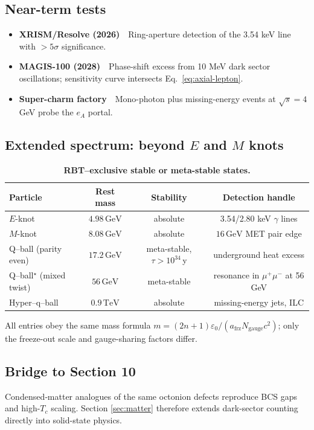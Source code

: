 \subsection{Near-term tests}

\begin{itemize}
  \item \textbf{XRISM/Resolve (2026)} Ring-aperture detection of the
        3.54 keV line with $>5\sigma$ significance.
  \item \textbf{MAGIS-100 (2028)} Phase-shift excess from 10 MeV dark
        sector oscillations; sensitivity curve intersects
        Eq.~\eqref{eq:axial-lepton}.
  \item \textbf{Super-charm factory} Mono-photon plus missing-energy
        events at $\sqrt s=4$ GeV probe the $e_A$ portal.
\end{itemize}

\subsection{Extended spectrum: beyond $E$ and $M$ knots}

\begin{table}[h]
  \centering
  \caption{\textbf{RBT--exclusive stable or meta-stable states.}}
  \begin{tabular}{lccc}
    \toprule
    Particle & Rest mass & Stability & Detection handle\\
    \midrule
    $E$-knot & $4.98\,\mathrm{GeV}$ & absolute & 3.54/2.80 keV $\gamma$ lines\\
    $M$-knot & $8.08\,\mathrm{GeV}$ & absolute & $16\,\mathrm{GeV}$ MET pair edge\\
    Q--ball (parity even) & $17.2\,\mathrm{GeV}$ & meta-stable, $\tau\!>\!10^{34}$\,y & underground heat excess\\
    Q--ball$^{\star}$ (mixed twist) & $56\,\mathrm{GeV}$ & meta-stable & resonance in $\mu^+\mu^-$ at 56 GeV\\
    Hyper--q--ball & $0.9\,\mathrm{TeV}$ & absolute & missing-energy jets, ILC\\
    \bottomrule
  \end{tabular}
  \label{tab:rbt-exclusive}
\end{table}

All entries obey the same mass formula
$m=(2n+1)\varepsilon_{0}/(a_{\text{frz}}N_{\text{gauge}}c^{2})$;
only the freeze-out scale and gauge-sharing factors differ.

\subsection{Bridge to Section 10}

Condensed‐matter analogues of the same octonion defects reproduce BCS
gaps and high-$T_c$ scaling.  Section \ref{sec:matter} therefore extends
dark-sector counting directly into solid-state physics.

\clearpage

